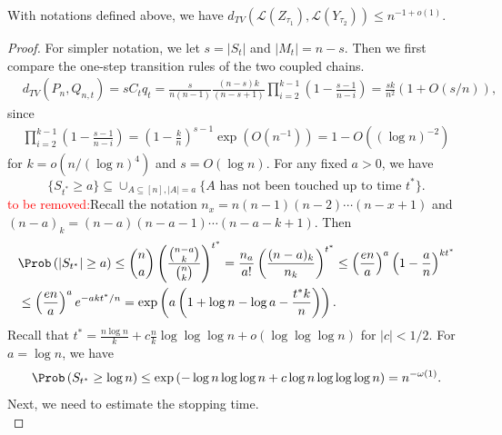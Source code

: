 \begin{lemma}
    With notations defined above, we have $d_{TV}(\mathcal{L}(Z_{\tau_1}),\mathcal{L}(Y_{\tau_2})) \leq n^{-1+o(1)}.$
\end{lemma}

\begin{proof}
For simpler notation, we let $s =|S_t|$ and $|M_t| = n-s.$ Then we first compare the one-step transition rules of the two coupled chains.
\begin{equation}
\begin{aligned}
    &d_{TV}(P_{n},Q_{n,t}) = sC_tq_t
    = \frac{s}{n(n-1)}\frac{(n-s)k}{(n-s+1)}\prod_{i=2}^{k-1}\left(1-\frac{s-1}{n-i}\right)
    = \frac{sk}{n^2}\left(1 + O(s/n)\right),
\end{aligned}
\end{equation}
since
\begin{equation}
\begin{aligned}
    \prod_{i=2}^{k-1}\left(1-\frac{s-1}{n-i}\right) = \left(1 - \frac{k}{n}\right)^{s-1}\exp(O(n^{-1})) = 1 - O((\log n)^{-2})
\end{aligned}
\end{equation}
for $k = o(n/(\log n)^4)$ and $s = O(\log n)$. For any fixed $a >0$, we have $$\{S_{t^*} \geq a\} \subseteq \cup_{A\subseteq[n], |A| = a} \{A \text{ has not been touched up to time }t^*\}.$$ \textcolor{red}{to be removed:}Recall the notation $n_x = n(n-1)(n-2)\cdots (n-x+1)$ and $(n-a)_k = (n-a)(n-a-1)\cdots (n-a-k+1)$. Then
\begin{equation}
\begin{aligned}
    &\Prob\left(|S_{t^*}| \geq  a\right) \leq \binom{n}{a}\left(\frac{\binom{n-a}{k}}{\binom{n}{k}}\right)^{t^*} = \frac{n_a}{a!}\left(\frac{(n-a)_k}{n_k}\right)^{t^*}
    \leq \left(\frac{en}{a}\right)^a \left(1-\frac{a}{n}\right)^{kt^*}\\
    &\leq \left(\frac{en}{a}\right)^a e^{-akt^*/n} = \exp\left( a\left(1 + \log n - \log a - \frac{t^*k}{n}\right) \right).
\end{aligned}
\end{equation}
Recall that $t^*  = \frac{n\log n}{k} + c\frac{n}{k}\log\log\log n + o(\log \log\log n)$ for $|c| < 1/2$.
For $a = \log n$, we have
\begin{equation}
    \Prob\left(S_{t^*} \geq \log n\right) \leq \exp \left( - \log n \log\log n + c\log n \log\log\log n\right) = n^{-\omega(1)}.
\end{equation}
Next, we need to estimate the stopping time.
\begin{equation}\label{eq: step1}

\end{equation}
\end{proof}
